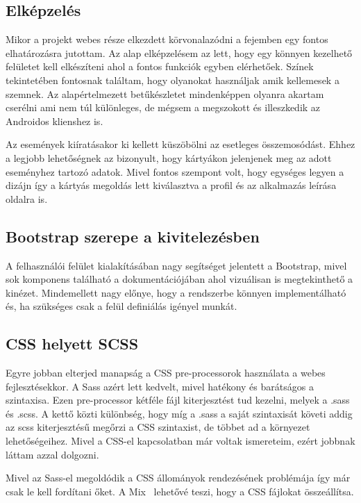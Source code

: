 \documentclass[
]{thesis-ekf}
\theoremstyle{definition}
\theoremstyle{remark}
\begin{document}
\subsection{Elképzelés}
Mikor a projekt webes része elkezdett körvonalazódni a fejemben egy fontos elhatározásra jutottam. Az alap elképzelésem az lett, hogy egy könnyen kezelhető felületet kell elkészíteni ahol a fontos funkciók egyben elérhetőek. Színek tekintetében fontosnak találtam, hogy olyanokat használjak amik kellemesek a szemnek. Az alapértelmezett betűkészletet mindenképpen olyanra akartam cserélni ami nem túl különleges, de mégsem a megszokott és illeszkedik az Androidos klienshez is.

Az események kiíratásakor ki kellett küszöbölni az esetleges összemosódást. Ehhez a legjobb lehetőségnek az bizonyult, hogy kártyákon jelenjenek meg az adott eseményhez tartozó adatok. Mivel fontos szempont volt, hogy egységes legyen a dizájn így a kártyás megoldás lett kiválasztva a profil és az alkalmazás leírása oldalra is. 

\subsection{Bootstrap szerepe a kivitelezésben}

A felhasználói felület kialakításában nagy segítséget jelentett a Bootstrap, mivel sok komponens található a dokumentációjában ahol vizuálisan is megtekinthető a kinézet. Mindemellett nagy előnye, hogy a rendszerbe könnyen implementálható és, ha szükséges csak a felül definiálás igényel munkát.

\subsection{CSS helyett SCSS}

Egyre jobban elterjed manapság a CSS pre-processorok használata a webes fejlesztésekkor. A Sass azért lett kedvelt, mivel hatékony és barátságos a szintaxisa. Ezen pre-processor kétféle fájl kiterjesztést tud kezelni, melyek a .sass és .scss. A kettő közti különbség, hogy míg a .sass a saját szintaxisát követi addig az scss kiterjesztésű megőrzi a CSS szintaxist, de többet ad a környezet lehetőségeihez. Mivel a CSS-el kapcsolatban már voltak ismereteim, ezért jobbnak láttam azzal dolgozni. 

Mivel az Sass-el megoldódik a CSS állományok rendezésének problémája így már csak le kell fordítani őket. A Mix~\cite{laravel_mix} lehetővé teszi, hogy a CSS fájlokat összeállítsa.  
\end{document}
